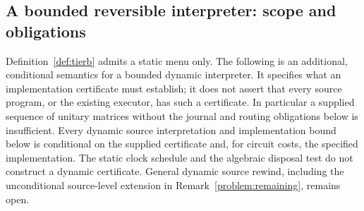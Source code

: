 \subsection{A bounded reversible interpreter: scope and obligations}

\begin{remark}\label{rem:tB-status}\label{target:tierB}
Definition~\ref{def:tierb} admits a static menu only. The following is
an additional, conditional semantics for a bounded dynamic interpreter.
It specifies what an implementation certificate must establish; it does
not assert that every source program, or the existing executor, has such
a certificate. In particular a supplied sequence of unitary matrices
without the journal and routing obligations below is insufficient.
Every dynamic source interpretation and implementation bound below is
conditional on the supplied certificate and, for circuit costs, the
specified implementation. The static clock schedule and the algebraic
disposal test do not construct a dynamic certificate. General dynamic
source rewind, including the unconditional source-level extension in
Remark~\ref{problem:remaining}, remains open.
\end{remark}

